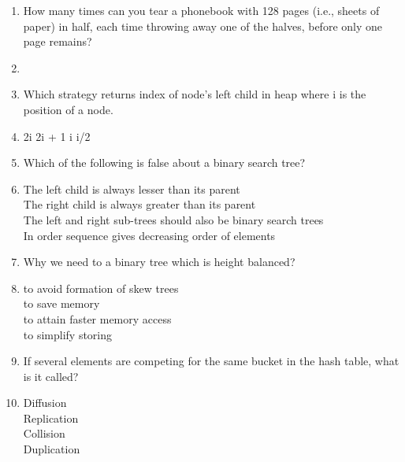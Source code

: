 \documentclass[12pt ,a4paper]{exam}
\begin{document}
	\begin{enumerate}[start=1,label={\bfseries Q\arabic*)}]
		\itemsep0.2em
		 \item How many times can you tear a phonebook with 128 pages (i.e., sheets of paper) in half, each time throwing away one of the halves, before only one page remains?
		\item[] 
		\begin{oneparchoices}
		\end{oneparchoices}
		\item Which strategy returns index of node’s left child in heap where i is the position of a node.
		\item[] 
		\begin{oneparchoices}
			\choice 2i  %
			\choice 2i + 1 
			\choice i
			\choice i/2
		\end{oneparchoices}
		
		\item Which of the following is false about a binary search tree?
		\item[] 
		\begin{oneparchoices}
			\choice The left child is always lesser than its parent \\ %
			\choice The right child is always greater than its parent \\
			\choice The left and right sub-trees should also be binary search trees\\
			\choice In order sequence gives decreasing order of elements
		\end{oneparchoices}
	
		\item  Why we need to a binary tree which is height balanced?
		\item[] 
		\begin{oneparchoices}
			\choice to avoid formation of skew trees\\  %
	    	\choice to save memory \\
	    	\choice to attain faster memory access\\
	    	\choice to simplify storing
		\end{oneparchoices}
	
		\item If several elements are competing for the same bucket in the hash table, what is it called?
		\item[] 
		\begin{oneparchoices}
			\choice  Diffusion\\%
			\choice  Replication\\
			\choice Collision\\
			\choice Duplication
	 	\end{oneparchoices}
 	    

\end{enumerate}
\end{document}
